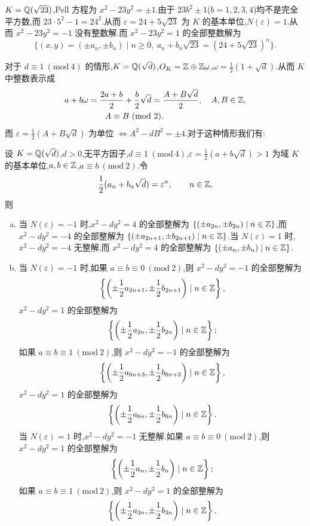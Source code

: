 \begin{example}\label{ex:ch3-s2-2-1}
$K=\mathbb{Q}(\sqrt{23})$,Pell 方程为 $x^2-23y^2=\pm 1$.由于 $23b^2\pm 1$($b=1,2,3,4$)均不是完全平方数,而 $23\cdot 5^2-1=24^2$.从而 $\varepsilon=24+5\sqrt{23}$ 为 $K$ 的基本单位,$N(\varepsilon)=1$.从而 $x^2-23y^2=-1$ 没有整数解.而 $x^2-23y^2=1$ 的全部整数解为
\[
  \{(x,y)=(\pm a_n,\pm b_n)\mid n\geqslant 0,\ a_n+b_n\sqrt{23}=(24+5\sqrt{23})^n\}.
\]
\end{example}

对于 $d\equiv 1\ (\mathrm{mod}\ 4)$ 的情形,$K=\mathbb{Q}(\sqrt{d})$,$O_K=\mathbb{Z}\oplus\mathbb{Z}\omega$,$\omega=\frac{1}{2}(1+\sqrt{d})$.从而 $K$ 中整数表示成
\begin{align*}
  a+b\omega&=\frac{2a+b}{2}+\frac{b}{2}\sqrt{d}=\frac{A+B\sqrt{d}}{2},\quad A,B\in\mathbb{Z},\\
  &\qquad A\equiv B\ (\mathrm{mod}\ 2).
\end{align*}
而 $\varepsilon=\frac{1}{2}(A+B\sqrt{d})$ 为单位 $\Leftrightarrow A^2-dB^2=\pm 4$.对于这种情形我们有:

\begin{lemma}\label{lem:ch3-11}
设 $K=\mathbb{Q}(\sqrt{d})$,$d>0$,无平方因子,$d\equiv 1\ (\mathrm{mod}\ 4)$,$\varepsilon=\frac{1}{2}(a+b\sqrt{d})>1$ 为域 $K$ 的基本单位,$a,b\in\mathbb{Z}$,$a\equiv b\ (\mathrm{mod}\ 2)$.令
\[
  \frac{1}{2}(a_n+b_n\sqrt{d})=\varepsilon^n,\qquad n\in\mathbb{Z},
\]
则
\begin{enumerate}[(a)]
  \item 当 $N(\varepsilon)=-1$ 时,$x^2-dy^2=4$ 的全部整解为 $\{(\pm a_{2n},\pm b_{2n})\mid n\in\mathbb{Z}\}$,而 $x^2-dy^2=-4$ 的全部整解为 $\{(\pm a_{2n+1},\pm b_{2n+1})\mid n\in\mathbb{Z}\}$.当 $N(\varepsilon)=1$ 时,$x^2-dy^2=-4$ 无整解,而 $x^2-dy^2=4$ 的全部整解为 $\{(\pm a_n,\pm b_n)\mid n\in\mathbb{Z}\}$.
  \item 当 $N(\varepsilon)=-1$ 时,如果 $a\equiv b\equiv 0\ (\mathrm{mod}\ 2)$,则 $x^2-dy^2=-1$ 的全部整解为
  \[
    \left\{\left(\pm\frac{1}{2}a_{2n+1},\pm\frac{1}{2}b_{2n+1}\right)\mid n\in\mathbb{Z}\right\},
  \]
  $x^2-dy^2=1$ 的全部整解为
  \[
    \left\{\left(\pm\frac{1}{2}a_{2n},\pm\frac{1}{2}b_{2n}\right)\mid n\in\mathbb{Z}\right\};
  \]
  如果 $a\equiv b\equiv 1\ (\mathrm{mod}\ 2)$,则 $x^2-dy^2=-1$ 的全部整解为
  \[
    \left\{\left(\pm\frac{1}{2}a_{6n+3},\pm\frac{1}{2}b_{6n+3}\right)\mid n\in\mathbb{Z}\right\},
  \]
  $x^2-dy^2=1$ 的全部整解为
  \[
    \left\{\left(\pm\frac{1}{2}a_{6n},\pm\frac{1}{2}b_{6n}\right)\mid n\in\mathbb{Z}\right\}.
  \]
  当 $N(\varepsilon)=1$ 时,$x^2-dy^2=-1$ 无整解.如果 $a\equiv b\equiv 0\ (\mathrm{mod}\ 2)$,则 $x^2-dy^2=1$ 的全部整解为
  \[
    \left\{\left(\pm\frac{1}{2}a_n,\pm\frac{1}{2}b_n\right)\mid n\in\mathbb{Z}\right\};
  \]
  如果 $a\equiv b\equiv 1\ (\mathrm{mod}\ 2)$,则 $x^2-dy^2=1$ 的全部整解为
  \[
    \left\{\left(\pm\frac{1}{2}a_{3n},\pm\frac{1}{2}b_{3n}\right)\mid n\in\mathbb{Z}\right\}.
  \]
\end{enumerate}
\end{lemma}

